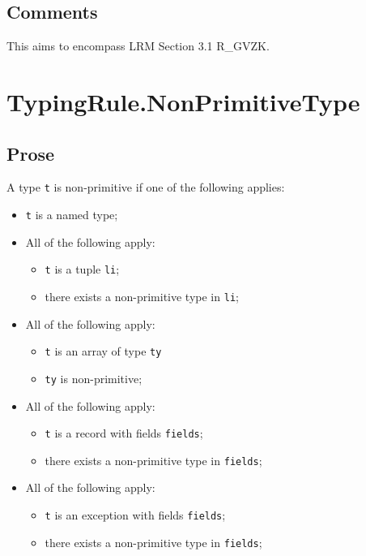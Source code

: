 \documentclass{book}
\begin{document}
    \subsection{Comments}
    This aims to encompass LRM Section 3.1 R\_GVZK.

\section{TypingRule.NonPrimitiveType}

    \subsection{Prose}
    A type \texttt{t} is non-primitive if one of the following applies:
    \begin{itemize}
    \item \texttt{t} is a named type;
    \item All of the following apply:
      \begin{itemize}
      \item \texttt{t} is a tuple \texttt{li};
      \item there exists a non-primitive type in \texttt{li};
      \end{itemize}
    \item All of the following apply:
      \begin{itemize}
      \item \texttt{t} is an array of type \texttt{ty}
      \item \texttt{ty} is non-primitive;
      \end{itemize}
    \item All of the following apply:
      \begin{itemize}
      \item \texttt{t} is a record with fields \texttt{fields};
      \item there exists a non-primitive type in \texttt{fields};
      \end{itemize}
    \item All of the following apply:
      \begin{itemize}
      \item \texttt{t} is an exception with fields \texttt{fields};
      \item there exists a non-primitive type in \texttt{fields};
      \end{itemize}
    \end{itemize}
\end{document}
